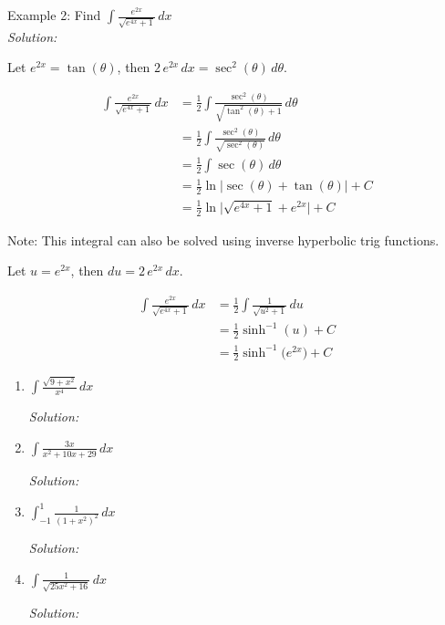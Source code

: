\documentclass[16pt]{article}
\theoremstyle{remark}
\begin{document}
\begin{mdframed}[style=TheoremFrame]
Example 2: Find $\displaystyle{ \int \frac{e^{2x}}{\sqrt{e^{4x}+1}} \, dx }$\\

\textit{Solution:}
\begin{center}
Let $e^{2x} = \tan(\theta)$, then $2\, e^{2x}\, dx = \sec^2(\theta)\, d\theta $.
\end{center}
\begin{align*}
\int \frac{e^{2x}}{\sqrt{e^{4x}+1}} \, dx &= \frac{1}{2} \int \frac{\sec^2(\theta)}{\sqrt{\tan^2(\theta)+1}} \, d\theta \\[2ex]
&= \frac{1}{2} \int \frac{\sec^2(\theta)}{\sqrt{\sec^2(\theta)}} \, d\theta \\[2ex]
&= \frac{1}{2} \int \sec(\theta)\, d\theta \\[2ex]
&= \frac{1}{2} \ln\big| \sec(\theta) + \tan(\theta) \big| + C\\[2ex]
&= \frac{1}{2} \ln\bigg| \sqrt{e^{4x}+1} + e^{2x} \bigg| + C
\end{align*}

Note: This integral can also be solved using inverse hyperbolic trig functions.

\begin{center}
Let $u = e^{2x}$, then $du = 2 \, e^{2x} \, dx$.
\end{center}
\begin{align*}
\int \frac{e^{2x}}{\sqrt{e^{4x}+1}} \, dx &= \frac{1}{2} \int \frac{1}{\sqrt{u^2+1}} \, du \\[2ex]
&= \frac{1}{2} \sinh^{-1} (u) + C\\[2ex]
&= \frac{1}{2} \sinh^{-1} \big(e^{2x}\big) + C
\end{align*}
\end{mdframed}
\newpage
\begin{enumerate}
\item $\displaystyle{\int \frac{\sqrt{9+x^2}}{x^4}\, dx}$
\begin{mdframed}[style=TheoremFrame]
\textit{Solution:}

\end{mdframed}

\item $\displaystyle{\int \frac{3x}{x^2+10x+29}\, dx}$
\begin{mdframed}[style=TheoremFrame]
\textit{Solution:}

\end{mdframed}
\newpage
\item $\displaystyle{\int_{-1}^{1} \frac{1}{(1+x^2)^2}\, dx}$
\begin{mdframed}[style=TheoremFrame]
\textit{Solution:}

\end{mdframed}

\item $\displaystyle{\int \frac{1}{\sqrt{25x^2+16}}\, dx}$
\begin{mdframed}[style=TheoremFrame]
\textit{Solution:}

\end{mdframed}
\newpage
\end{enumerate}
\end{document}

